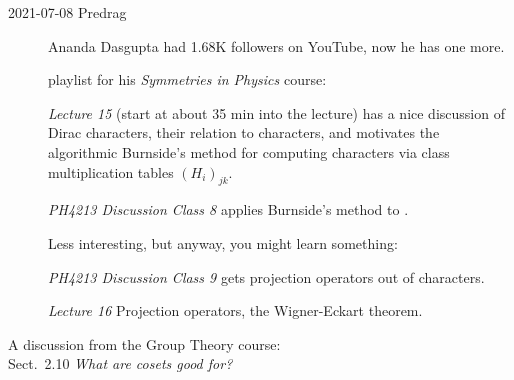 \begin{description}
\item[2021-07-08 Predrag]
Ananda Dasgupta had 1.68K followers on YouTube, now he has one more.

playlist for his {\em Symmetries in Physics}  course:

 {\em Lecture 15}
(start at about 35 min into the lecture) has a nice discussion of Dirac
characters, their relation to characters, and motivates the algorithmic
Burnside's method for computing characters via class multiplication tables
$(H_i)_{jk}$.

{\em PH4213 Discussion Class 8}
applies Burnside's method to .

Less interesting, but anyway, you might learn something:

{\em PH4213 Discussion Class 9}
gets projection operators out of characters.

 {\em Lecture 16}
Projection operators, the Wigner-Eckart theorem.

\end{description}

\noindent
A discussion from the Group Theory course:\\
{Sect.~2.10 {\em What are cosets good for?}}


